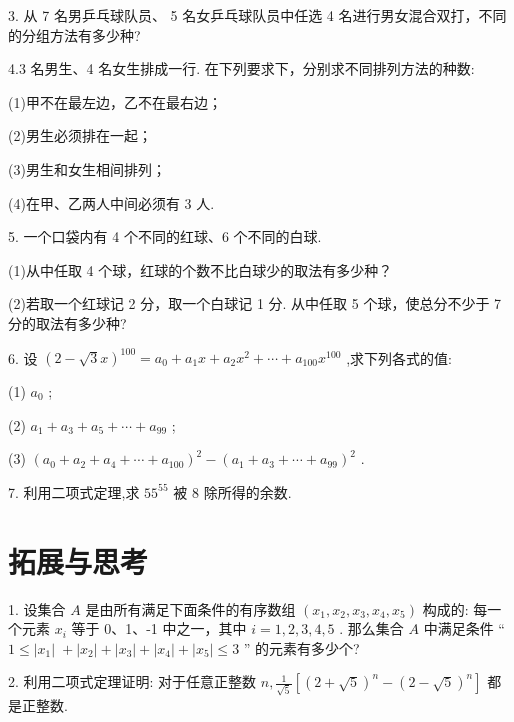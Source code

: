 \documentclass[10pt]{article}
\begin{document}
3. 从 7 名男乒乓球队员、 5 名女乒乓球队员中任选 4 名进行男女混合双打，不同的分组方法有多少种?

4.3 名男生、4 名女生排成一行. 在下列要求下，分别求不同排列方法的种数:

(1)甲不在最左边，乙不在最右边；

(2)男生必须排在一起；

(3)男生和女生相间排列；

(4)在甲、乙两人中间必须有 3 人.

5. 一个口袋内有 4 个不同的红球、6 个不同的白球.

(1)从中任取 4 个球，红球的个数不比白球少的取法有多少种？

(2)若取一个红球记 2 分，取一个白球记 1 分. 从中任取 5 个球，使总分不少于 7 分的取法有多少种?

6. 设 \({\left( 2 - \sqrt{3}x\right) }^{100} = {a}_{0} + {a}_{1}x + {a}_{2}{x}^{2} + \cdots  + {a}_{100}{x}^{100}\) ,求下列各式的值:

(1) \({a}_{0}\) ;

(2) \({a}_{1} + {a}_{3} + {a}_{5} + \cdots  + {a}_{99}\) ;

(3) \({\left( {a}_{0} + {a}_{2} + {a}_{4} + \cdots  + {a}_{100}\right) }^{2} - {\left( {a}_{1} + {a}_{3} + \cdots  + {a}_{99}\right) }^{2}\) .

7. 利用二项式定理,求 \({55}^{55}\) 被 8 除所得的余数.

\section*{}

\section*{}

\section*{拓展与思考}

1. 设集合 \(A\) 是由所有满足下面条件的有序数组 \(\left( {{x}_{1},{x}_{2},{x}_{3},{x}_{4},{x}_{5}}\right)\) 构成的: 每一个元素 \({x}_{i}\) 等于 0、1、-1 中之一，其中 \(i = 1,2,3,4,5\) . 那么集合 \(A\) 中满足条件 “ \(1 \leq  \left| {x}_{1}\right| \; + \left| {x}_{2}\right|  + \left| {x}_{3}\right|  + \left| {x}_{4}\right|  + \left| {x}_{5}\right|  \leq  3\) ” 的元素有多少个?

2. 利用二项式定理证明: 对于任意正整数 \(n,\frac{1}{\sqrt{5}}\left\lbrack  {{\left( 2 + \sqrt{5}\right) }^{n} - {\left( 2 - \sqrt{5}\right) }^{n}}\right\rbrack\) 都是正整数.
\end{document}
